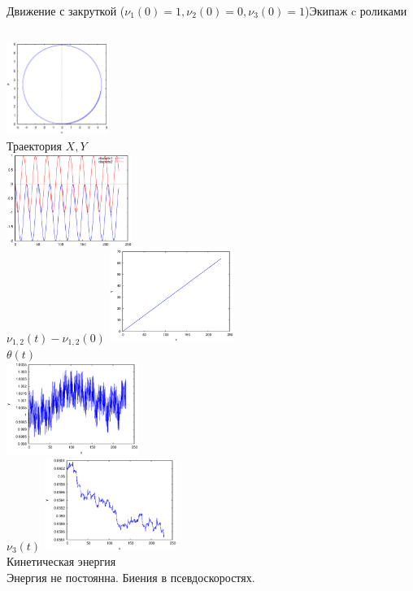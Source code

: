 \documentclass{beamer}
\begin{document}
\begin{frame}{Движение с закруткой ($\nu_1(0) = 1, \nu_2(0) = 0, \nu_3(0) = 1$)}{Экипаж c роликами}
    \begin{columns}
            \centering
            \includegraphics[width=\linewidth, height=30mm]{_sol__1_0_1__0__230__1e2_trajectory} \\
            Траектория $X, Y$ \\
            \includegraphics[width=\linewidth, height=30mm]{_sol__1_0_1__0__230__1e2_nu12_centered} \\
            $\nu_{1,2}(t) - \nu_{1,2}(0)$
            \centering
            \includegraphics[width=\linewidth, height=30mm]{_sol__1_0_1__0__230__1e2_theta} \\
            $\theta(t)$ \\
            \includegraphics[width=\linewidth, height=30mm]{_sol__1_0_1__0__230__1e2_nu3} \\
            $\nu_3(t)$
            \centering
            \includegraphics[width=\linewidth, height=30mm]{_sol__1_0_1__0__230__1e2_kin_en} \\
            Кинетическая энергия \\
            \vspace{15pt}
            Энергия не постоянна. Биения в псевдоскоростях.
    \end{columns}
\end{frame}
\end{document}
